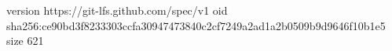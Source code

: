 version https://git-lfs.github.com/spec/v1
oid sha256:ce90bd3f8233303ccfa30947473840c2cf7249a2ad1a2b0509b9d9646f10b1e5
size 621
